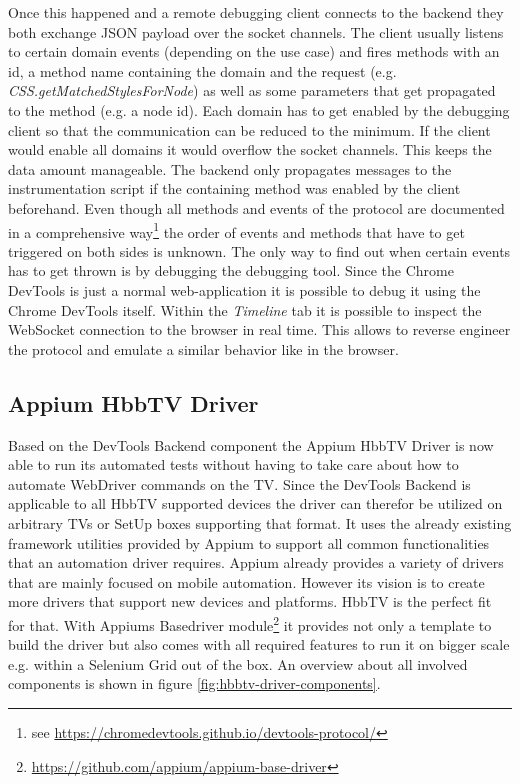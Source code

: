 Once this happened and a remote debugging client connects to the backend they both exchange JSON
payload over the socket channels. The client usually listens to certain domain events (depending
on the use case) and fires methods with an id, a method name containing the domain and the request
(e.g. \textit{CSS.getMatchedStylesForNode}) as well as some parameters that get propagated to the
method (e.g. a node id). Each domain has to get enabled by the debugging client so that the
communication can be reduced to the minimum. If the client would enable all domains it would
overflow the socket channels. This keeps the data amount manageable. The backend only propagates
messages to the instrumentation script if the containing method was enabled by the client
beforehand. Even though all methods and events of the protocol are documented in a comprehensive
way\footnote{see \url{https://chromedevtools.github.io/devtools-protocol/}} the order of events
and methods that have to get triggered on both sides is unknown. The only way to find out when
certain events has to get thrown is by debugging the debugging tool. Since the Chrome DevTools
is just a normal web-application it is possible to debug it using the Chrome DevTools itself.
Within the \textit{Timeline} tab it is possible to inspect the WebSocket connection to the browser
in real time. This allows to reverse engineer the protocol and emulate a similar behavior like in
the browser.

\subsection{Appium HbbTV Driver\label{sec:appiumhbbtvdriver}}

Based on the DevTools Backend component the Appium HbbTV Driver is now able to run its automated
tests without having to take care about how to automate WebDriver commands on the TV. Since the
DevTools Backend is applicable to all HbbTV supported devices the driver can therefor be utilized
on arbitrary TVs or SetUp boxes supporting that format. It uses the already existing framework
utilities provided by Appium to support all common functionalities that an automation driver
requires. Appium already provides a variety of drivers that are mainly focused on mobile automation.
However its vision is to create more drivers that support new devices and platforms. HbbTV is the
perfect fit for that. With Appiums Basedriver module\footnote{\url{https://github.com/appium/appium-base-driver}}
it provides not only a template to build the driver but also comes with all required features to
run it on bigger scale e.g. within a Selenium Grid out of the box. An overview about all involved
components is shown in figure \ref{fig:hbbtv-driver-components}.

